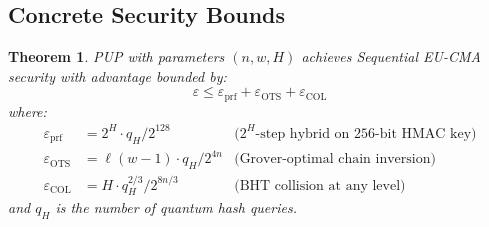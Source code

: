\documentclass[11pt]{article}
\newtheorem{theorem}{Theorem}
\begin{document}
\subsection{Concrete Security Bounds}

\begin{theorem}\label{thm:concrete}
PUP with parameters $(n, w, H)$ achieves Sequential EU-CMA security
with advantage bounded by:
\[
\varepsilon \leq \varepsilon_{\mathrm{prf}} +
\varepsilon_{\mathrm{OTS}} + \varepsilon_{\mathrm{COL}}
\]
where:
\begin{align}
\varepsilon_{\mathrm{prf}} &= 2^H \cdot q_H / 2^{128}
& \text{($2^H$-step hybrid on 256-bit HMAC key)} \\
\varepsilon_{\mathrm{OTS}} &= \ell(w-1) \cdot q_H / 2^{4n}
& \text{(Grover-optimal chain inversion)} \\
\varepsilon_{\mathrm{COL}} &= H \cdot q_H^{2/3} / 2^{8n/3}
& \text{(BHT collision at any level)}
\end{align}
and $q_H$ is the number of quantum hash queries.
\end{theorem}
\end{document}
